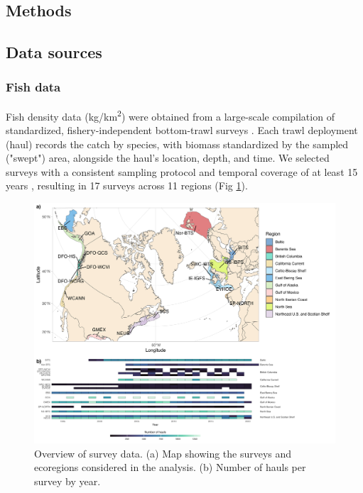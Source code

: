\documentclass[11pt]{article}
\begin{document}
\begin{spacing}{1.5}

\section{Methods}

\subsection{Data sources}

\subsubsection{Fish data}

Fish density data (kg/km\textsuperscript{2}) were obtained from 
a large-scale compilation of standardized, fishery-independent bottom-trawl surveys \citep{maureaud_fishglob_data_2024}. Each trawl deployment (haul) records the catch by species, with biomass standardized by the sampled ("swept") area, alongside the haul’s location, depth, and time. We selected surveys with a consistent sampling protocol and temporal coverage of at least 15 years \citep{maureaud_fishglob_data_2024}, resulting in 17 surveys across 11 regions (Fig \ref{fig:map}).

\begin{figure}[h]
    \centering
    \includegraphics[scale=0.7]{output/figures/map.png}
\caption{Overview of survey data. (a) Map showing the surveys and ecoregions considered in the analysis. (b) Number of hauls per survey by year.}
    \label{fig:map}
\end{figure}


\end{spacing}
\end{document}

